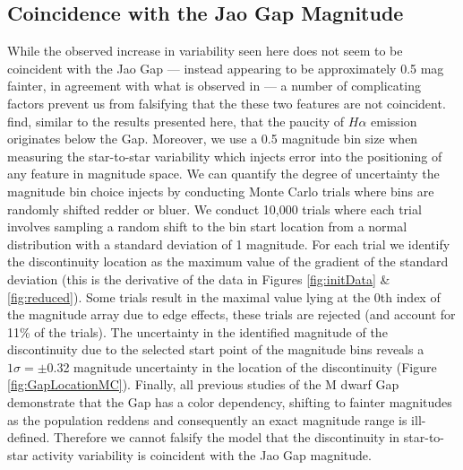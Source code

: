 \subsection{Coincidence with the Jao Gap Magnitude}\label{sec:coincident}
While the observed increase in variability seen here does not seem to be
coincident with the Jao Gap --- instead appearing to be approximately 0.5 mag
fainter, in agreement with what is observed in \citet{Jao2023} --- a number of
complicating factors prevent us from falsifying that the these two features are
not coincident. \citeauthor{Jao2023} find, similar to the results presented
here, that the paucity of $H\alpha$ emission originates below the Gap.
Moreover, we use a 0.5 magnitude bin size when measuring the star-to-star
variability which injects error into the positioning of any feature in
magnitude space. We can quantify the degree of uncertainty the magnitude bin
choice injects by conducting Monte Carlo trials where bins are randomly shifted
redder or bluer. We conduct 10,000 trials where each trial involves sampling a
random shift to the bin start location from a normal distribution with a
standard deviation of 1 magnitude. For each trial we identify the discontinuity
location as the maximum value of the gradient of the standard deviation (this
is the derivative of the data in Figures \ref{fig:initData} \&
\ref{fig:reduced}). Some trials result in the maximal value lying at the 0th
index of the magnitude array due to edge effects, these trials are rejected
(and account for 11\% of the trials). The uncertainty in the identified
magnitude of the discontinuity due to the selected start point of the magnitude
bins reveals a $1\sigma = \pm$0.32 magnitude uncertainty in the location of the
discontinuity (Figure \ref{fig:GapLocationMC}). Finally, all previous studies
of the M dwarf Gap \citep{Jao2018, Jao2021, Mansfield2021, Boudreaux2022,
Jao2023} demonstrate that the Gap has a color dependency, shifting to fainter
magnitudes as the population reddens and consequently an exact magnitude range
is ill-defined. Therefore we cannot falsify the model that the discontinuity in
star-to-star activity variability is coincident with the Jao Gap magnitude.

